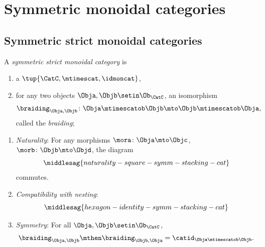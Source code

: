 
\section{Symmetric monoidal categories}



\subsection{Symmetric strict monoidal categories}
\begin{ctdefinition}
    \label{def:sym-stacking-cat}
    A \emph{symmetric strict monoidal category} is

    \constit

    \begin{enumerate}
        \item a  $\tup{\CatC, \mtimescat, \idmoncat}$,
        \item for any two objects $\Obja, \Objb \setin \Ob_\CatC$, an isomorphism
              \begin{equation}
                  \braiding_{\Obja,\Objb} \colon \Obja \mtimescatob \Objb \mto \Objb \mtimescatob \Obja,
              \end{equation}
              called the \emph{braiding};
    \end{enumerate}

    \condit

    \begin{enumerate}
        \item \emph{Naturality}: For any morphisms $\mora \colon \Obja \mto \Objc$, $\morb \colon \Objb \mto \Objd$, the diagram
              \begin{equation}\label{eq:naturality-square-symm-stacking-cat}
                  \middlesag{naturality-square-symm-stacking-cat}
              \end{equation}
              commutes.
        \item \emph{Compatibility with nesting}:
              \begin{equation}\label{eq:hexagon-identity-symm-stacking-cat}
                  \middlesag{hexagon-identity-symm-stacking-cat}
              \end{equation}

        \item \emph{Symmetry}: For all $\Obja, \Objb \setin \Ob_\CatC$,
              \begin{equation}
                  \braiding_{\Obja, \Objb} \mthen \braiding_{\Objb, \Obja} = \catid_{\Obja \mtimescatob \Objb}.
              \end{equation}
    \end{enumerate}
\end{ctdefinition}


